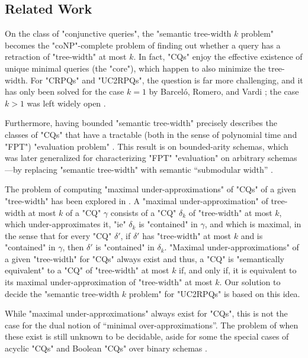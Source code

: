 \subsection{Related Work}
\label{sec:relwork}
On the class of "conjunctive queries", the "semantic tree-width $k$ problem" becomes the "coNP"-complete problem of finding out whether a query has a retraction of "tree-width"
at most $k$. In fact, "CQs" enjoy the effective existence of unique minimal queries \cite[Theorem 12]{ChandraMerlin1977Implementation} (the "core"), which happen to also minimize the tree-width. For "CRPQs" and "UC2RPQs", the question is far more challenging, and it has only been solved for the case $k = 1$ 
by Barceló, Romero, and Vardi \cite[Theorem 6.1]{BarceloRomeroVardi2016SemanticAcyclicity}; the case $k>1$ was left widely open
\cite[\S~7]{BarceloRomeroVardi2016SemanticAcyclicity}.

Furthermore, having bounded "semantic tree-width" precisely describes
the classes of "CQs" that have a tractable (both in the sense of polynomial time
and "FPT") "evaluation problem" \cite[Theorem~1.1]{Grohe2007ComplexityHomomorphism}.
This result is on bounded-arity schemas, which was later generalized \cite[Theorem~1]{ChenGottlobLanzingerPichler2020Semantic} for characterizing "FPT" "evaluation" on arbitrary schemas---by replacing "semantic tree-width" with semantic ``submodular width'' \cite{Marx13Tractable}.

The problem of computing "maximal under-approximations" of "CQs" of a given "tree-width" has been explored in \cite{BarceloLibkinRomero2014Efficient}.
A "maximal under-approximation" of tree-width at most $k$ of a "CQ" $\gamma$ consists of a
"CQ" $\delta_k$ of "tree-width" at most $k$, which under-approximates it,
"ie" $\delta_k$ is "contained" in $\gamma$, and which is maximal, in the sense that for every "CQ" 
$\delta'$, if $\delta'$ has "tree-width" at most $k$ and is "contained" in $\gamma$, then 
$\delta'$ is "contained" in $\delta_k$. 
"Maximal under-approximations" of a given "tree-width" for "CQs" always exist \cite{BarceloLibkinRomero2014Efficient} and thus, a "CQ" is "semantically equivalent"
to a "CQ" of "tree-width" at most $k$ if, and only if, it is equivalent to its maximal under-approximation of "tree-width" at most $k$. Our solution to decide the
"semantic tree-width $k$ problem" for "UC2RPQs" is based on this idea.

While "maximal under-approximations" always exist for "CQs", this is not the case for the dual notion of ``minimal over-approximations''. The problem of when these exist is still unknown to be decidable, aside for some the special cases of acyclic "CQs" and Boolean "CQs" over binary schemas \cite{BarceloRomeroZeume2020Approximation}.


